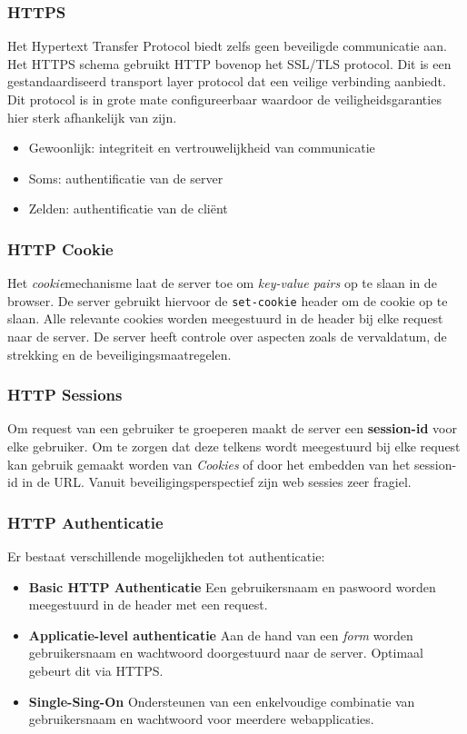 \documentclass[../main.tex]{subfiles}
\begin{document}
\subsubsection{HTTPS}
Het Hypertext Transfer Protocol biedt zelfs geen beveiligde communicatie aan. Het HTTPS schema gebruikt HTTP bovenop het SSL/TLS protocol. Dit is een gestandaardiseerd transport layer protocol dat een veilige verbinding aanbiedt. Dit protocol is in grote mate configureerbaar waardoor de veiligheidsgaranties hier sterk afhankelijk van zijn.
\begin{itemize}
	\item Gewoonlijk: integriteit en vertrouwelijkheid van communicatie
	\item Soms: authentificatie van de server
	\item Zelden: authentificatie van de cli\"ent
\end{itemize}

\subsubsection{HTTP Cookie}
Het \textit{cookie}mechanisme laat de server toe om \textit{key-value pairs} op te slaan in de browser. De server gebruikt hiervoor de \texttt{set-cookie} header om de cookie op te slaan. Alle relevante cookies worden meegestuurd in de header bij elke request naar de server. De server heeft controle over aspecten zoals de vervaldatum, de strekking en de beveiligingsmaatregelen.

\subsubsection{HTTP Sessions}
Om request van een gebruiker te groeperen maakt de server een \textbf{session-id} voor elke gebruiker. Om te zorgen dat deze telkens wordt meegestuurd bij elke request kan gebruik gemaakt worden van \textit{Cookies} of door het embedden van het session-id in de URL. Vanuit beveiligingsperspectief zijn web sessies zeer fragiel.  

\subsubsection{HTTP Authenticatie}
Er bestaat verschillende mogelijkheden tot authenticatie:
\begin{itemize}
	\item \textbf{Basic HTTP Authenticatie} Een gebruikersnaam en paswoord worden meegestuurd in de header met een request.
	\item \textbf{Applicatie-level authenticatie} Aan de hand van een \textit{form} worden gebruikersnaam en wachtwoord doorgestuurd naar de server. Optimaal gebeurt dit via HTTPS.
	\item \textbf{Single-Sing-On} Ondersteunen van een enkelvoudige combinatie van gebruikersnaam en wachtwoord voor meerdere webapplicaties.
\end{itemize}
\end{document}
